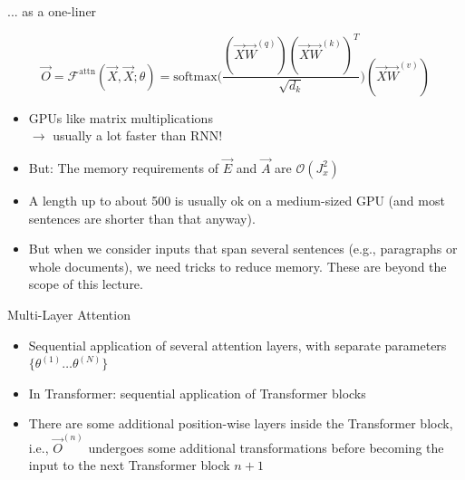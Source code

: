 \begin{vbframe}{... as a one-liner}

\vfill

\large
$$ \vec O = \mathcal{F}^\mathrm{attn}(\vec X, \vec X; \theta) = \mathrm{softmax}\Big(\frac{(\vec X\vec W^{(q)} ) (\vec X\vec W^{(k)} )^T}{\sqrt{d_k}}\Big)(\vec X\vec W^{(v)} ) $$
\begin{itemize}
\item GPUs like matrix multiplications\\$\rightarrow$ usually a lot faster than RNN!
\item But: The memory requirements of $\vec E$ and $\vec A$ are $\mathcal{O}(J_x^2)$
\item A length up to about 500 is usually ok on a medium-sized GPU (and most sentences are shorter than that anyway).
\item But when we consider inputs that span several sentences (e.g., paragraphs or whole documents), we need tricks to reduce memory. These are beyond the scope of this lecture.
\end{itemize}

\vfill

\end{vbframe}


\begin{vbframe}{Multi-Layer Attention}

\vfill

\begin{itemize}
\item Sequential application of several attention layers, with separate parameters $\{\theta^{(1)} \ldots \theta^{(N)}\}$ 
\item In Transformer: sequential application of Transformer blocks
\item There are some additional position-wise layers inside the Transformer block, i.e., $\vec O^{(n)}$ undergoes some additional transformations before becoming the input to the next Transformer block $n+1$
\end{itemize}

\vfill

\end{vbframe}


